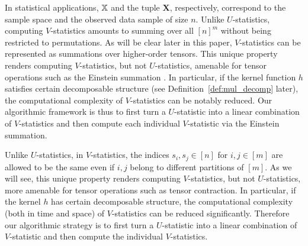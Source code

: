 \documentclass[letterpaper,11pt]{article}
\newcommand{\Lin}[1]{{\color{purple}{Lin: #1}}}
\newcommand{\Zhang}[1]{{\color{blue}{Zhang: #1}}}
\newcommand{\sper}{\sigma}
\newcommand{\ustat}{\mathbb{U}}
\newcommand{\vstat}{\mathbb{V}}
\newcommand{\ustatp}[2]{\ustat(#1,#2)}
\newcommand{\vstatp}[2]{\vstat(#1,#2)}
\begin{document}
\begin{bibunit}[plainnat]
In statistical applications, ${\mathbb{X}}$ and the tuple $\bm{X}$, respectively, correspond to the sample space and the observed data sample of size $n$. Unlike $U$-statistics, computing $V$-statistics amounts to summing over all $[n]^{m}$ without being restricted to permutations. As will be clear later in this paper, $V$-statistics can be represented as summations over higher-order tensors. This unique property renders computing $V$-statistics, but not $U$-statistics, amenable for tensor operations such as the Einstein summation \citep{einstein1916grundlage}. In particular, if the kernel function $h$ satisfies certain decomposable structure (see Definition~\ref{def:mul_decomp} later), the computational complexity of $V$-statistics can be notably reduced.
Our algorithmic framework is thus to first turn a $U$-statistic into a linear combination of $V$-statistics and then compute each individual $V$-statistic via the Einstein summation.

\iffalse
Unlike $U$-statistics, in $V$-statistics, the indices $s_{i}, s_{j} \in [n]$ for $i, j \in [m]$ are allowed to be the same even if $i, j$ belong to different partitions of $[m]$. As we will see, this unique property renders computing $V$-statistics, but not $U$-statistics, more amenable for tensor operations such as tensor contraction. In particular, if the kernel $h$ has certain decomposable structure, the computational complexity (both in time and space) of $V$-statistics can be reduced significantly. Therefore our algorithmic strategy is to first turn a $U$-statistic into a linear combination of $V$-statistic and then compute the individual $V$-statistics.


\end{bibunit}
\end{document}
